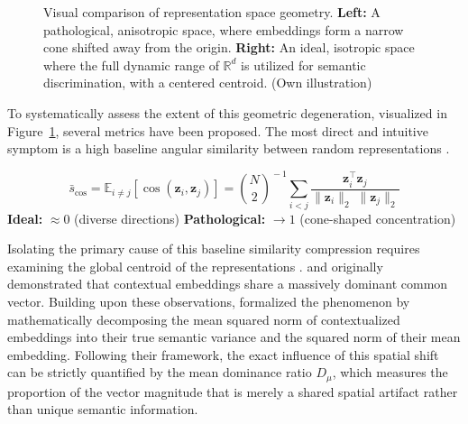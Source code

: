 \begin{figure}[htpb]
    \caption[Visual comparison of representation space geometry.]{Visual comparison of representation space geometry. \textbf{Left:} A pathological, anisotropic space, where embeddings form a narrow cone shifted away from the origin. \textbf{Right:} An ideal, isotropic space where the full dynamic range of $\mathbb{R}^d$ is utilized for semantic discrimination, with a centered centroid. (Own illustration)}
    \label{fig:isotropy_comparison}
\end{figure}


To systematically assess the extent of this geometric degeneration, visualized in Figure~\ref{fig:isotropy_comparison}, several metrics have been proposed. The most direct and intuitive symptom is a high baseline angular similarity between random representations \cite{ethayarajh-2019-contextual, rudman-etal-2022-isoscore, wang-isola-2020-contrastive,roy2007effective}.

\begin{metricbox}
\begin{equation}
    \bar{s}_{\cos} = \mathbb{E}_{i \neq j}[\cos(\mathbf{z}_i, \mathbf{z}_j)] = \binom{N}{2}^{\!-1} \sum_{i < j} \frac{\mathbf{z}_i^\top \mathbf{z}_j}{\|\mathbf{z}_i\|_2\;\|\mathbf{z}_j\|_2}
    \label{met:avg_cosine}
\end{equation}
\textbf{Ideal:} $\approx 0$ (diverse directions) \quad \textbf{Pathological:} $\to 1$ (cone-shaped concentration)
\end{metricbox}

Isolating the primary cause of this baseline similarity compression requires examining the global centroid of the representations \cite{yamagiwa2025norm}. \citet{mu2018allbutthetop} and \citet{ethayarajh-2019-contextual} originally demonstrated that contextual embeddings share a massively dominant common vector. Building upon these observations, \citet{yamagiwa2025norm} formalized the phenomenon by mathematically decomposing the mean squared norm of contextualized embeddings into their true semantic variance and the squared norm of their mean embedding. Following their framework, the exact influence of this spatial shift can be strictly quantified by the mean dominance ratio $D_\mu$, which measures the proportion of the vector magnitude that is merely a shared spatial artifact rather than unique semantic information.


